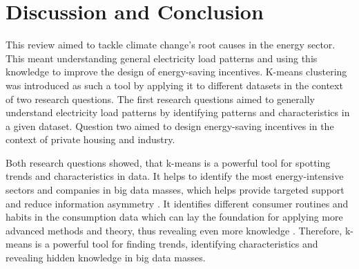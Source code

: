 


\section{Discussion and Conclusion}
\label{cha:discussionAndConclusion}

This review aimed to tackle climate change's root causes in the energy sector.
This meant understanding general electricity load patterns and using this knowledge to improve the design of energy-saving incentives.
K-means clustering was introduced as such a tool by applying it to different datasets in the context of two research questions.
The first research questions aimed to generally understand electricity load patterns by identifying patterns and characteristics in a given dataset.
Question two aimed to design energy-saving incentives in the context of private housing and industry.

Both research questions showed, that k-means is a powerful tool for spotting trends and characteristics in data.
It helps to identify the most energy-intensive sectors and companies in big data masses, which helps provide targeted support and reduce information asymmetry \cite{LIU-BDE}.
It identifies different consumer routines and habits in the consumption data which can lay the foundation for applying more advanced methods and theory, thus revealing even more knowledge \cite{MAL-HBP}.
Therefore, k-means is a powerful tool for finding trends, identifying characteristics and revealing hidden knowledge in big data masses.

